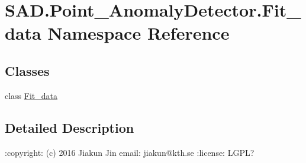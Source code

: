 \hypertarget{namespaceSAD_1_1Point__AnomalyDetector_1_1Fit__data}{}\section{S\+A\+D.\+Point\+\_\+\+Anomaly\+Detector.\+Fit\+\_\+data Namespace Reference}
\label{namespaceSAD_1_1Point__AnomalyDetector_1_1Fit__data}
\subsection*{Classes}
\begin{DoxyCompactItemize}
\item 
class \hyperlink{classSAD_1_1Point__AnomalyDetector_1_1Fit__data_1_1Fit__data}{Fit\+\_\+data}
\end{DoxyCompactItemize}


\subsection{Detailed Description}
\begin{DoxyVerb}:copyright: (c) 2016 Jiakun Jin
email: jiakun@kth.se
:license: LGPL?
\end{DoxyVerb}
 